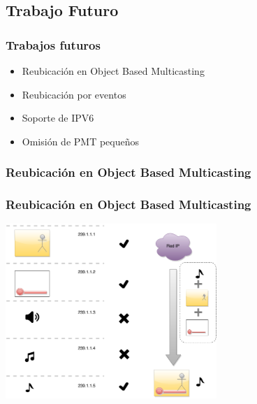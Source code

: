 \documentclass[a4paper,11pt]{beamer}
\begin{document}
	\subsection{Trabajo Futuro}
	\begin{frame}
		\frametitle{Trabajos futuros}
		\begin{itemize}
			\item Reubicación en Object Based Multicasting
			\item Reubicación por eventos
			\item Soporte de IPV6
			\item Omisión de PMT pequeños
		\end{itemize}
	\end{frame}
		
		\subsubsection{Reubicación en Object Based Multicasting}
		\begin{frame}
			\frametitle{Reubicación en Object Based Multicasting}
			\begin{center}
				\includegraphics[width=8cm]{object_based_multicast.png}
			\end{center}
		\end{frame}

		
\end{document}
